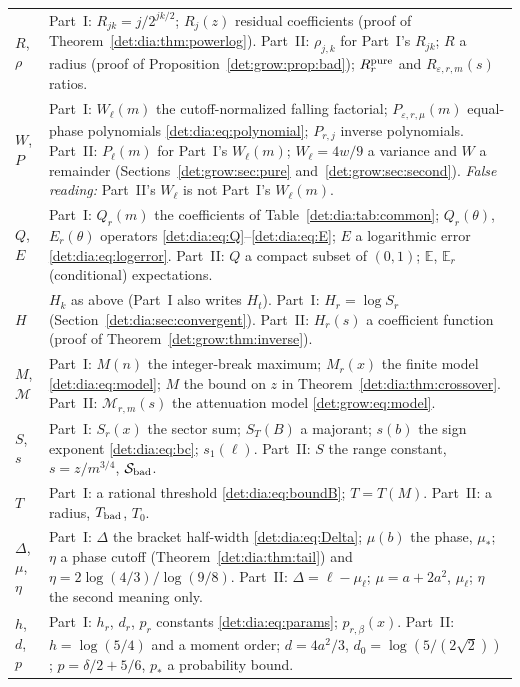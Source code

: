 \documentclass[11pt,letterpaper]{article}
\numberwithin{equation}{section}
\theoremstyle{definition}\newtheorem{definition}[theorem]{Definition}
\theoremstyle{remark}\newtheorem{remark}[theorem]{Remark}
\newcommand{\eps}{\varepsilon}
\newcommand{\E}{\mathbb E}
\begin{document}
\begin{longtable}{@{}>{\raggedright\arraybackslash}p{} >{\raggedright\arraybackslash}p{}@{}}
$R$, $\rho$ & Part~I: $R_{jk}=j/2^{jk/2}$; $R_j(z)$ residual coefficients (proof of Theorem~\ref{det:dia:thm:powerlog}). Part~II: $\rho_{j,k}$ for Part~I's $R_{jk}$; $R$ a radius (proof of Proposition~\ref{det:grow:prop:bad}); $R_r^{\rm pure}$ and $R_{\eps,r,m}(s)$ ratios.\\
$W$, $P$ & Part~I: $W_\ell(m)$ the cutoff-normalized falling factorial; $P_{\eps,r,\mu}(m)$ equal-phase polynomials \eqref{det:dia:eq:polynomial}; $P_{r,j}$ inverse polynomials. Part~II: $P_\ell(m)$ for Part~I's $W_\ell(m)$; $W_\ell=4w/9$ a variance and $W$ a remainder (Sections~\ref{det:grow:sec:pure} and~\ref{det:grow:sec:second}). \emph{False reading:} Part~II's $W_\ell$ is not Part~I's $W_\ell(m)$.\\
$Q$, $E$ & Part~I: $Q_r(m)$ the coefficients of Table~\ref{det:dia:tab:common}; $Q_r(\theta)$, $E_r(\theta)$ operators \eqref{det:dia:eq:Q}--\eqref{det:dia:eq:E}; $E$ a logarithmic error \eqref{det:dia:eq:logerror}. Part~II: $Q$ a compact subset of $(0,1)$; $\E$, $\E_r$ (conditional) expectations.\\
$H$ & $H_k$ as above (Part~I also writes $H_t$). Part~I: $H_r=\log S_r$ (Section~\ref{det:dia:sec:convergent}). Part~II: $H_r(s)$ a coefficient function (proof of Theorem~\ref{det:grow:thm:inverse}).\\
$M$, $\mathcal M$ & Part~I: $M(n)$ the integer-break maximum; $M_r(x)$ the finite model \eqref{det:dia:eq:model}; $M$ the bound on $z$ in Theorem~\ref{det:dia:thm:crossover}. Part~II: $\mathcal M_{r,m}(s)$ the attenuation model \eqref{det:grow:eq:model}.\\
$S$, $s$ & Part~I: $S_r(x)$ the sector sum; $S_T(B)$ a majorant; $s(b)$ the sign exponent \eqref{det:dia:eq:bc}; $s_1(\ell)$. Part~II: $S$ the range constant, $s=z/m^{3/4}$, $\mathcal S_{\rm bad}$.\\
$T$ & Part~I: a rational threshold \eqref{det:dia:eq:boundB}; $T=T(M)$. Part~II: a radius, $T_{\rm bad}$, $T_0$.\\
$\Delta$, $\mu$, $\eta$ & Part~I: $\Delta$ the bracket half-width \eqref{det:dia:eq:Delta}; $\mu(b)$ the phase, $\mu_*$; $\eta$ a phase cutoff (Theorem~\ref{det:dia:thm:tail}) and $\eta=2\log(4/3)/\log(9/8)$. Part~II: $\Delta=\ell-\mu_\ell$; $\mu=a+2a^2$, $\mu_\ell$; $\eta$ the second meaning only.\\
$h$, $d$, $p$ & Part~I: $h_r$, $d_r$, $p_r$ constants \eqref{det:dia:eq:params}; $p_{r,\beta}(x)$. Part~II: $h=\log(5/4)$ and a moment order; $d=4a^2/3$, $d_0=\log(5/(2\sqrt2))$; $p=\delta/2+5/6$, $p_*$ a probability bound.\\

\end{longtable}
\end{document}
